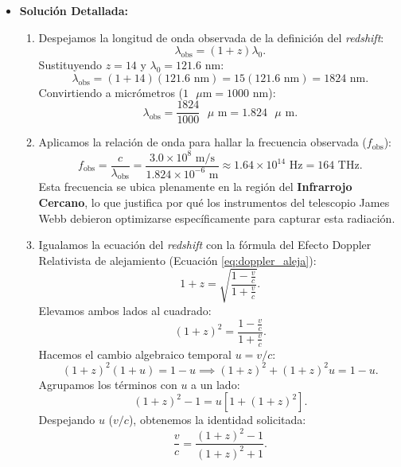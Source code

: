 \documentclass[11pt,a4paper]{book}
\begin{document}
\begin{itemize}
\item[Ejercicio \ref{item:redshift}:]

\textbf{Solución Detallada:}
    \begin{enumerate}
        \item[a)] Despejamos la longitud de onda observada de la definición del \textit{redshift}:
        \begin{equation}
            \lambda_{\text{obs}} = (1 + z) \lambda_0.
        \end{equation}
        Sustituyendo $z = 14$ y $\lambda_0 = 121.6 \text{ nm}$:
        \begin{equation}
            \lambda_{\text{obs}} = (1 + 14)(121.6 \text{ nm}) = 15(121.6 \text{ nm}) = 1824 \text{ nm}.
        \end{equation}
        Convirtiendo a micrómetros ($1 \text{ $\mu$m} = 1000 \text{ nm}$):
        \begin{equation}
            \lambda_{\text{obs}} = \frac{1824}{1000} \text{ $\mu$ m} = 1.824 \text{ $\mu$ m}.
        \end{equation}
        
        \item[b)] Aplicamos la relación de onda para hallar la frecuencia observada ($f_{\text{obs}}$):
        \begin{equation}
            f_{\text{obs}} = \frac{c}{\lambda_{\text{obs}}} = \frac{3.0 \times 10^8 \text{ m/s}}{1.824 \times 10^{-6} \text{ m}} \approx 1.64 \times 10^{14} \text{ Hz} = 164 \text{ THz}.
        \end{equation}
        Esta frecuencia se ubica plenamente en la región del \textbf{Infrarrojo Cercano}, lo que justifica por qué los instrumentos del telescopio James Webb debieron optimizarse específicamente para capturar esta radiación.
        
        \item[c)] Igualamos la ecuación del \textit{redshift} con la fórmula del Efecto Doppler Relativista de alejamiento (Ecuación \eqref{eq:doppler_aleja}):
        \begin{equation}
            1 + z = \sqrt{\frac{1 - \frac{v}{c}}{1 + \frac{v}{c}}}.
        \end{equation}
        Elevamos ambos lados al cuadrado:
        \begin{equation}
            (1 + z)^2 = \frac{1 - \frac{v}{c}}{1 + \frac{v}{c}}.
        \end{equation}
        Hacemos el cambio algebraico temporal $u = v/c$:
        \begin{equation}
            (1 + z)^2 (1 + u) = 1 - u \implies (1 + z)^2 + (1 + z)^2 u = 1 - u.
        \end{equation}
        Agrupamos los términos con $u$ a un lado:
        \begin{equation}
            (1 + z)^2 - 1 = u \left[ 1 + (1 + z)^2 \right].
        \end{equation}
        Despejando $u$ ($v/c$), obtenemos la identidad solicitada:
        \begin{equation}
            \frac{v}{c} = \frac{(1 + z)^2 - 1}{(1 + z)^2 + 1}.
        \end{equation}
        

\end{enumerate}
\end{itemize}
\end{document}
